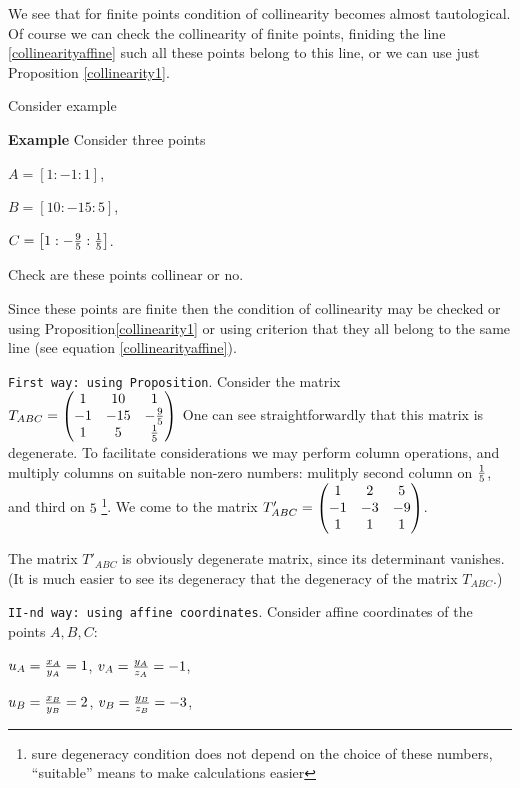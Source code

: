 \documentclass[12pt]{article}
\numberwithin{equation}{section}
\begin{document}
We see that for finite points condition of collinearity
 becomes almost tautological.
  Of course we can check the collinearity of finite points,
finiding the line \eqref{collinearityaffine} 
such all these points belong to this line, or
we can use just Proposition \ref{collinearity1}.

Consider example

\m

{\bf Example} Consider three points

   $A=[1:-1:1]$, 
   
     $B=[10:-15:5]$,
 
   $C=\left[1:-{9\over 5}:{1\over 5}\right]$.

  Check are these points collinear or no.

   
Since these points are finite then the condition of collinearity
may be checked or using Proposition\ref{collinearity1}
or using criterion that they all belong to the same line
(see equation \eqref{collinearityaffine}).
 
   
\smallskip

{\tt First way: using Proposition}. Consider  the matrix 
$T_{ABC}=\begin{pmatrix}
      1 & 10 & 1\cr
      -1 & -15 & -{9\over 5}\cr
      1 & 5 & {1\over 5}\cr
   \end{pmatrix}$
One can see straightforwardly that this matrix is degenerate.
To facilitate considerations we may perform column operations,
and  multiply columns on suitable non-zero numbers:
mulitply second column on ${1\over 5}$,
and third on $5$
\footnote
{sure degeneracy condition
 does not depend on the choice of these numbers, ``suitable''
means to make calculations easier}.
We come to the matrix
 $T'_{ABC}=\begin{pmatrix}
      1 & 2 & 5\cr
      -1 & -3 & -9\cr
      1 & 1 & 1\cr
   \end{pmatrix}$.



The matrix  $T'_{ABC}$  is obviously degenerate matrix, since its determinant
vanishes.
  (It is much easier to see its degeneracy that the degeneracy of the
  matrix $T_{ABC}$.)

\m

{\tt II-nd  way: using affine coordinates}.
  Consider affine coordinates of the points $A,B,C$: 

     $u_A={x_A\over y_A}=1$, $v_A={y_A\over z_A}=-1$,
     
        $u_B={x_B\over y_B}=2$, $v_B={y_B\over z_B}=-3$,
     
\end{document}
